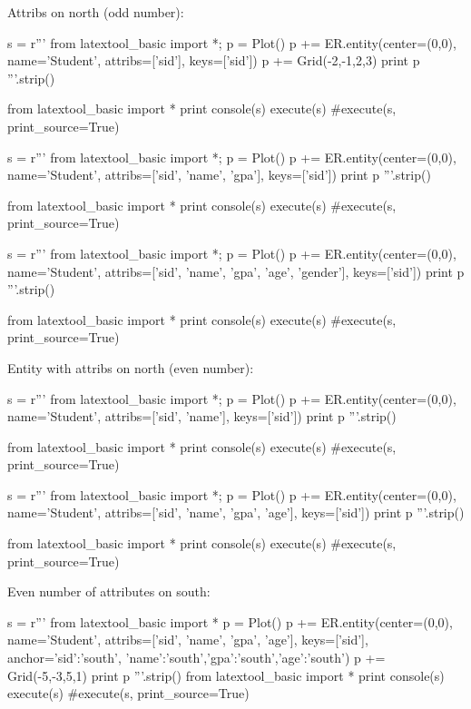 \newpage
Attribs on north (odd number):
\begin{python}
s = r'''
from latextool_basic import *; p = Plot()
p += ER.entity(center=(0,0),
               name='Student',
               attribs=['sid'],
               keys=['sid'])
p += Grid(-2,-1,2,3)
print p
'''.strip()

from latextool_basic import *
print console(s)
execute(s)
#execute(s, print_source=True)
\end{python}
\begin{python}
s = r'''
from latextool_basic import *; p = Plot()
p += ER.entity(center=(0,0),
          name='Student',
          attribs=['sid', 'name', 'gpa'], keys=['sid'])
print p
'''.strip()

from latextool_basic import *
print console(s)
execute(s)
#execute(s, print_source=True)
\end{python}
\begin{python}
s = r'''
from latextool_basic import *; p = Plot()
p += ER.entity(center=(0,0),
          name='Student',
          attribs=['sid', 'name', 'gpa', 'age', 'gender'],
          keys=['sid'])
print p
'''.strip()

from latextool_basic import *
print console(s)
execute(s)
#execute(s, print_source=True)
\end{python}


\newpage
Entity with attribs on north (even number):
\begin{python}
s = r'''
from latextool_basic import *; p = Plot()
p += ER.entity(center=(0,0),
          name='Student',
          attribs=['sid', 'name'], keys=['sid'])
print p
'''.strip()

from latextool_basic import *
print console(s)
execute(s)
#execute(s, print_source=True)
\end{python}
\begin{python}
s = r'''
from latextool_basic import *; p = Plot()
p += ER.entity(center=(0,0),
          name='Student',
          attribs=['sid', 'name', 'gpa', 'age'], keys=['sid'])
print p
'''.strip()

from latextool_basic import *
print console(s)
execute(s)
#execute(s, print_source=True)
\end{python}



\newpage
Even number of attributes on south:
\begin{python}
s = r'''
from latextool_basic import *
p = Plot()
p += ER.entity(center=(0,0),
          name='Student',
          attribs=['sid', 'name', 'gpa', 'age'],
          keys=['sid'],
          anchor={'sid':'south', 'name':'south','gpa':'south','age':'south'})
p += Grid(-5,-3,5,1)
print p
'''.strip()
from latextool_basic import *
print console(s)
execute(s)
#execute(s, print_source=True)
\end{python}

